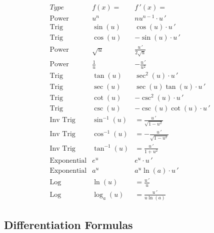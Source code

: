 \documentclass[handout]{ximera}
\begin{document}
\begin{center}
\[
\begin{array}{c|c|c}
		Type & f(x)= & f\,'(x)=  \\
		\hline
		\text{Power} & u^n & nu^{n-1}\cdot u\,'  \\[8pt]
		\hline
		\text{Trig} & \sin\left(u\right) & \cos\left(u\right) \cdot u\,' \\[8pt]
		\text{Trig} & \cos\left(u\right) & -\sin\left(u\right)\cdot u\,'  \\[8pt]
		\hline
		\text{Power} & \sqrt{u} & \displaystyle \frac{u\,' }{2\sqrt {u}}\\[8pt]
		\text{Power} & \displaystyle \frac{1}{u} & -\displaystyle \frac{u\,' }{u^2}\\[8pt]
	  \hline
	  \text{Trig} & \tan\left(u\right) & \sec^2\left(u\right) \cdot u\,'  \\[8pt]
		\text{Trig} & \sec\left(u\right) & \sec\left(u\right)\tan\left(u\right) \cdot u\,'  \\[8pt]
		\hline
		\text{Trig} & \cot\left(u\right) & -\csc^2\left(u\right) \cdot u\,'   \\[8pt]
		\text{Trig} & \csc\left(u\right) & -\csc\left(u\right)\cot\left(u\right) \cdot u\,'   \\[8pt]
		\hline
		\text{Inv Trig} & \sin^{-1}\left(u\right) &  = \frac{u\,' }{\sqrt{1-u^2}}  \\[8pt]
		\text{Inv Trig} & \cos^{-1}\left(u\right) &  = -\frac{u\,' }{\sqrt{1-u^2}}\\[8pt]
		\text{Inv Trig} & \tan^{-1}\left(u\right) &  = \frac{u\,' }{1+u^2} \\[8pt]
		\hline
		\text{Exponential} & e^{u} & e^{u} \cdot u\,' \\[8pt]
		\text{Exponential} & a^{u} & a^{u}\ln(a) \cdot u\,' \\[8pt]
		\hline
		\text{Log} & \ln\left(u\right) &  = \frac{u\,'}{u} \\[8pt]
		\text{Log} & \log_a\left(u\right) &  = \frac{u\,'}{u\ln(a)}
	\end{array}
    \]
\end{center}



\subsection{Differentiation Formulas}
\end{document}

